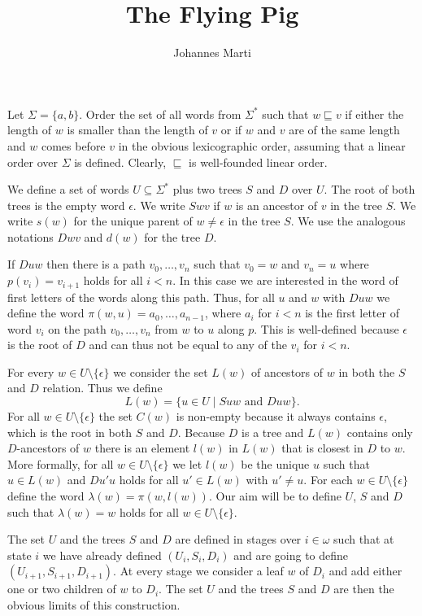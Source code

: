 \documentclass[a4paper]{article}
\title{The Flying Pig}
\author{Johannes Marti}
\begin{document}
\maketitle

Let $\Sigma = \{a,b\}$. Order the set of all words from $\Sigma^*$ such
that $w \sqsubseteq v$ if either the length of $w$ is smaller than the
length of $v$ or if $w$ and $v$ are of the same length and $w$ comes
before $v$ in the obvious lexicographic order, assuming that a linear
order over $\Sigma$ is defined. Clearly, $\sqsubseteq$ is well-founded
linear order.

We define a set of words $U \subseteq \Sigma^*$ plus two trees $S$ and
$D$ over $U$. The root of both trees is the empty word $\epsilon$. We
write $S w v$ if $w$ is an ancestor of $v$ in the tree $S$. We write
$s(w)$ for the unique parent of $w \neq \epsilon$ in the tree $S$. We
use the analogous notations $D w v$ and $d(w)$ for the tree $D$.

If $D u w$ then there is a path $v_0, \dots, v_n$ such that $v_0 = w$
and $v_n = u$ where $p(v_i) = v_{i + 1}$ holds for all $i < n$. In this
case we are interested in the word of first letters of the words along
this path. Thus, for all $u$ and $w$ with $D u w$ we define the word
$\pi(w,u) = a_0,\dots,a_{n - 1}$, where $a_i$ for $i < n$ is the first
letter of word $v_i$ on the path $v_0, \dots, v_n$ from $w$ to $u$ along
$p$. This is well-defined because $\epsilon$ is the root of $D$ and can
thus not be equal to any of the $v_i$ for $i < n$.

For every $w \in U \setminus\{\epsilon\}$ we consider the set $L(w)$ of
ancestors of $w$ in both the $S$ and $D$ relation. Thus we define
\[
 L(w) = \{ u \in U \mid S u w \mbox{ and } D u w\} .
\]
For all $w \in U \setminus \{\epsilon\}$ the set $C(w)$ is non-empty
because it always contains $\epsilon$, which is the root in both $S$ and
$D$. Because $D$ is a tree and $L(w)$ contains only $D$-ancestors of $w$
there is an element $l(w)$ in $L(w)$ that is closest in $D$ to $w$. More
formally, for all $w \in U \setminus \{\epsilon\}$ we let $l(w)$ be the
unique $u$ such that $u \in L(w)$ and $D u' u$ holds for all $u' \in
L(w)$ with $u' \neq u$. For each $w \in U \setminus \{\epsilon\}$ define
the word $\lambda(w) = \pi(w,l(w))$. Our aim will be to define $U$, $S$
and $D$ such that $\lambda(w) = w$ holds for all $w \in U \setminus
\{\epsilon\}$.

The set $U$ and the trees $S$ and $D$ are defined in stages over $i \in
\omega$ such that at state $i$ we have already defined $(U_i,S_i,D_i)$
and are going to define $(U_{i + 1},S_{i + 1},D_{i + 1})$. At every
stage we consider a leaf $w$ of $D_i$ and add either one or two children
of $w$ to $D_i$. The set $U$ and the trees $S$ and $D$ are then the
obvious limits of this construction.
\end{document}
